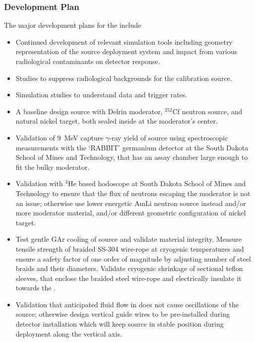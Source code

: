\subsubsection{Development Plan}
The major development plans for the  include
\begin{itemize}
\item Continued development of relevant simulation tools including geometry representation of the source deployment system and impact from various radiological contaminants on detector response. 
\item Studies to suppress radiological backgrounds for the calibration source.
\item Simulation studies to understand data and trigger rates.
\item A baseline design source with Delrin moderator, $^{252}$Cf neutron source, and natural nickel target, both sealed inside at the moderator's center.
\item Validation of \SI{9}{\MeV} capture $\gamma$-ray yield of source using spectroscopic measurements with the `RABBIT' germanium detector at the South Dakota School of Mines and Technology, that has an assay chamber large enough to fit the bulky moderator. 
\item Validation with $^{3}$He based hodoscope at South Dakota School of Mines and Technology to ensure that the flux of neutrons escaping the moderator is not an issue; otherwise use lower energetic AmLi neutron source instead and/or more moderator material, and/or different geometric configuration of nickel target. 
\item Test gentle GAr cooling of source and validate material integrity. Measure tensile strength of braided SS-304 wire-rope at cryogenic temperatures and ensure a safety factor of one order of magnitude by adjusting number of steel braids and their diameters. Validate cryogenic shrinkage of sectional teflon sleeves, that enclose the braided steel wire-rope and electrically insulate it towards the . 
\item Validation that anticipated fluid flow in  does not cause oscillations of the source; otherwise design vertical guide wires to be pre-installed during detector installation 
which will keep source in stable position during deployment along the vertical axis.

\end{itemize}
